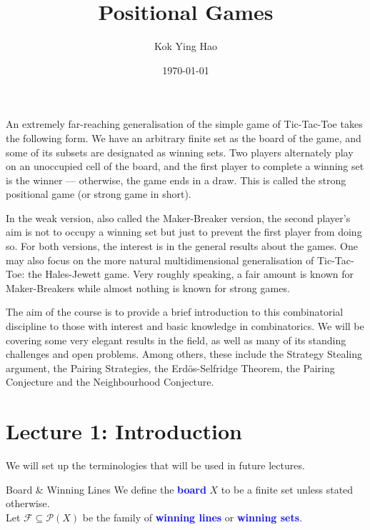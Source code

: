 \documentclass[12pt]{article}
\title{Positional Games}
\author{Kok Ying Hao}
\date{\today}
\newcommand\boldblue[1]{\textcolor{blue}{\textbf{#1}}}
\begin{document}
\maketitle

\noindent An extremely far-reaching generalisation of the simple game of Tic-Tac-Toe takes the following
form. We have an arbitrary finite set as the board of the game, and some of its subsets are
designated as winning sets. Two players alternately play on an unoccupied cell of the board,
and the first player to complete a winning set is the winner — otherwise, the game ends in a
draw. This is called the strong positional game (or strong game in short).

In the weak version, also called the Maker-Breaker version, the second player’s aim is not to
occupy a winning set but just to prevent the first player from doing so. For both versions,
the interest is in the general results about the games. One may also focus on the more natural
multidimensional generalisation of Tic-Tac-Toe: the Hales-Jewett game. Very roughly speaking,
a fair amount is known for Maker-Breakers while almost nothing is known for strong games.

The aim of the course is to provide a brief introduction to this combinatorial discipline to those
with interest and basic knowledge in combinatorics. We will be covering some very elegant
results in the field, as well as many of its standing challenges and open problems. Among
others, these include the Strategy Stealing argument, the Pairing Strategies, the Erd\"{o}s-Selfridge
Theorem, the Pairing Conjecture and the Neighbourhood Conjecture.

\tableofcontents




\newpage
\section{Lecture 1: Introduction}
We will set up the terminologies that will be used in future lectures.

\begin{definition}[label=board_lines]{Board \& Winning Lines}
We define the \boldblue{board} $X$ to be a finite set unless stated otherwise. \\
Let $\mathcal{F} \subseteq \mathcal{P}(X)$ be the family of \boldblue{winning lines} or \boldblue{winning sets}.
\end{definition}
\end{document}
